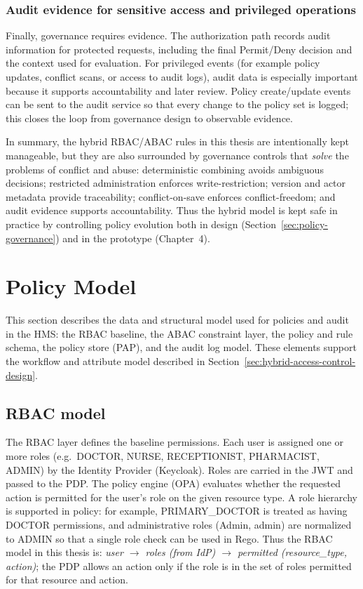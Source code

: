 \subsubsection*{Audit evidence for sensitive access and privileged operations}
Finally, governance requires evidence. The authorization path records audit information for protected requests, including the final Permit/Deny decision and the context used for evaluation. For privileged events (for example policy updates, conflict scans, or access to audit logs), audit data is especially important because it supports accountability and later review. Policy create/update events can be sent to the audit service so that every change to the policy set is logged; this closes the loop from governance design to observable evidence.
\vspace{0.5cm}

In summary, the hybrid RBAC/ABAC rules in this thesis are intentionally kept manageable, but they are also surrounded by governance controls that \emph{solve} the problems of conflict and abuse: deterministic combining avoids ambiguous decisions; restricted administration enforces write-restriction; version and actor metadata provide traceability; conflict-on-save enforces conflict-freedom; and audit evidence supports accountability. Thus the hybrid model is kept safe in practice by controlling policy evolution both in design (Section~\ref{sec:policy-governance}) and in the prototype (Chapter~4).
\section{Policy Model}
\label{sec:policy-model}

This section describes the data and structural model used for policies and audit in the HMS: the RBAC baseline, the ABAC constraint layer, the policy and rule schema, the policy store (PAP), and the audit log model. These elements support the workflow and attribute model described in Section~\ref{sec:hybrid-access-control-design}.

\subsection{RBAC model}
\label{sec:rbac-model}

The RBAC layer defines the baseline permissions. Each user is assigned one or more roles (e.g.\ DOCTOR, NURSE, RECEPTIONIST, PHARMACIST, ADMIN) by the Identity Provider (Keycloak). Roles are carried in the JWT and passed to the PDP. The policy engine (OPA) evaluates whether the requested action is permitted for the user's role on the given resource type. A role hierarchy is supported in policy: for example, PRIMARY\_DOCTOR is treated as having DOCTOR permissions, and administrative roles (Admin, admin) are normalized to ADMIN so that a single role check can be used in Rego. Thus the RBAC model in this thesis is: \emph{user $\rightarrow$ roles (from IdP) $\rightarrow$ permitted (resource\_type, action)}; the PDP allows an action only if the role is in the set of roles permitted for that resource and action.

